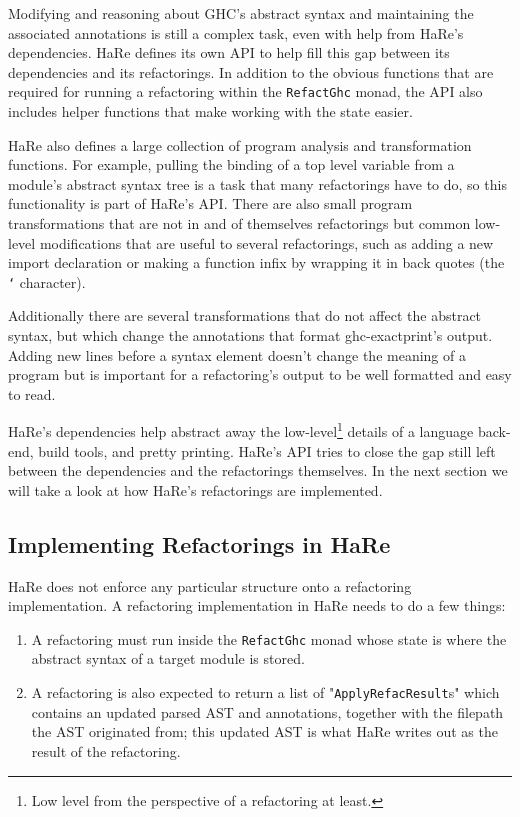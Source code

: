 Modifying and reasoning about GHC's abstract syntax and maintaining the associated annotations is still a complex task, even with help from HaRe's dependencies. HaRe defines its own API to help fill this gap between its dependencies and its refactorings. In addition to the obvious functions that are required for running a refactoring within the \texttt{RefactGhc} monad, the API also includes helper functions that make working with the state easier. 

HaRe also defines a large collection of program analysis and transformation functions. For example, pulling the binding of a top level variable from a module's abstract syntax tree is a task that many refactorings have to do, so this functionality is part of HaRe's API. There are also small program transformations that are not in and of themselves refactorings but common low-level modifications that are useful to several refactorings, such as adding a new import declaration or making a function infix by wrapping it in back quotes (the \texttt{`} character).

Additionally there are several transformations that do not affect the abstract syntax, but which change the annotations that format ghc-exactprint's output. Adding new lines before a syntax element doesn't change the meaning of a program but is important for a refactoring's output to be well formatted and easy to read. 

HaRe's dependencies help abstract away the low-level\footnote{Low level from the perspective of a refactoring at least.} details of a language back-end, build tools, and pretty printing. HaRe's API tries to close the gap still left between the dependencies and the refactorings themselves. In the next section we will take a look at how HaRe's refactorings are implemented.


\subsection{Implementing Refactorings in HaRe}

HaRe does not enforce any particular structure onto a refactoring implementation. A refactoring implementation in HaRe needs to do a few things:

\begin{enumerate}
\item A refactoring must run inside the \texttt{RefactGhc} monad whose state is where the abstract syntax of a target module is stored.
\item A refactoring is also expected to return a list of  "\texttt{ApplyRefacResult}s" which contains an updated parsed AST and annotations, together with the filepath the AST originated from; this updated AST is what HaRe writes out as the result of the refactoring.
\end{enumerate}

